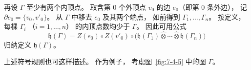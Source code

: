 再设 $\Gamma$ 至少有两个内顶点。
取含第 $0$ 个外顶点 $v_0$ 的边
$e_0$（即第 $0$ 条外边），
记
$\partial e_0=\{v_0,v'_0\}$。
从 $\Gamma$ 中移去 $e_0$
及其两个端点，
如前得到
$\Gamma_1,\ldots,\Gamma_n$。
按定义，
每棵 $\Gamma_i$
（$i=1,\ldots,n$）
的内顶点数均少于 $\Gamma$。
因此可用公式
\[
\mathfrak h(\Gamma)
=Z(e_0)\circ Z(v'_0)\circ
\bigl(
\mathfrak h(\Gamma_1)\widehat\otimes
\cdots\widehat\otimes
\mathfrak h(\Gamma_n)
\bigr)
\]
归纳定义 $\mathfrak h(\Gamma)$。

上述符号规则也可这样描述。
作为例子，
考虑图~\ref{fig:7-4-5}
中的图 $\Gamma$。

